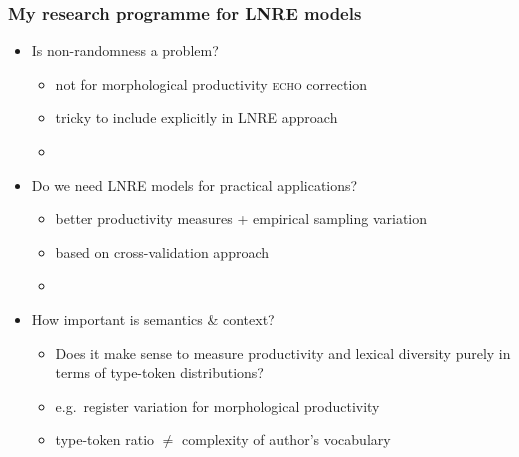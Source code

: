 \documentclass[t]{beamer} %
\begin{document}
\begin{frame}[c]
  \frametitle{My research programme for LNRE models}

  \begin{itemize}
  \item Is non-randomness a problem?
    \begin{itemize}
    \item not for morphological productivity \so \textsc{echo} correction
    \item tricky to include explicitly in LNRE approach
    \item[]
    \end{itemize}
  \item Do we need LNRE models for practical applications?
    \begin{itemize}
    \item better productivity measures + empirical sampling variation
    \item based on cross-validation approach \citep{Evert:Wankerl:Noeth:17}
    \item[]
    \end{itemize}
  \item How important is semantics \& context?
    \begin{itemize}
    \item Does it make sense to measure productivity and lexical diversity purely in terms of type-token distributions?
    \item e.g.\ register variation for morphological productivity
    \item type-token ratio $\neq$ complexity of author's vocabulary
    \end{itemize}
  \end{itemize}
\end{frame}




\end{document}
